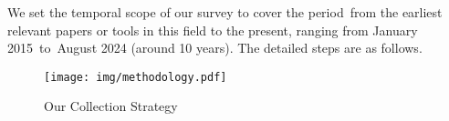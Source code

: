
We set the temporal scope of our survey to cover the period~from the earliest relevant papers or tools in this field to the present, ranging from January 2015~to~August 2024 (\ie around 10 years). The detailed steps are as follows.


\begin{figure}[!t]
  \texttt{[image: img/methodology.pdf]}
  \caption{Our Collection Strategy}
  \label{img:collection_methodology}
\end{figure}

